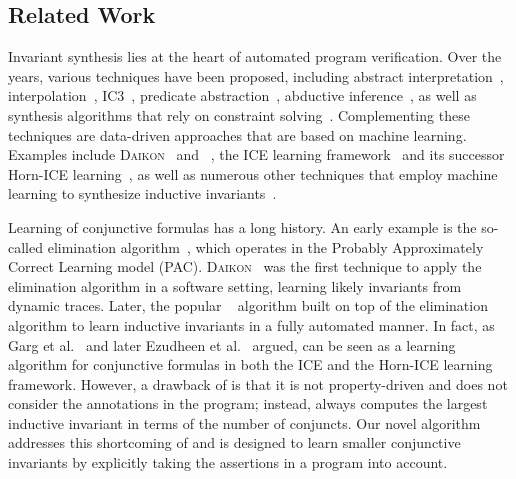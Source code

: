 
\subsection*{Related Work}
Invariant synthesis lies at the heart of automated program verification.
Over the years, various techniques have been proposed, including abstract interpretation~\cite{DBLP:conf/popl/CousotC77}, interpolation~\cite{DBLP:conf/cav/McMillan03}, IC3~\cite{DBLP:conf/vmcai/Bradley11}, predicate abstraction~\cite{DBLP:conf/pldi/BallMMR01}, abductive inference~\cite{DBLP:conf/oopsla/DilligDLM13}, as well as synthesis algorithms that rely on constraint solving~\cite{DBLP:conf/cav/ColonSS03,DBLP:conf/fmcad/FedyukovichKB17,DBLP:conf/pldi/GulwaniSV08,DBLP:conf/cav/GuptaR09}.
Complementing these techniques are data-driven approaches that are based on machine learning.
Examples include \textsc{Daikon}~\cite{DBLP:conf/icse/ErnstCGN00} and \houdini~\cite{DBLP:conf/fm/FlanaganL01}, the ICE learning framework~\cite{DBLP:conf/cav/0001LMN14} and its successor Horn-ICE learning~\cite{DBLP:conf/tacas/ChampionC0S18,DBLP:journals/pacmpl/EzudheenND0M18}, as well as numerous other techniques that employ machine learning to synthesize inductive invariants~\cite{DBLP:conf/cav/0001LMN13,DBLP:journals/corr/KrishnaPW15,DBLP:conf/cav/0001A14,DBLP:conf/esop/0001GHALN13,DBLP:conf/sas/0001GHAN13,DBLP:conf/cav/SharmaNA12,DBLP:conf/pldi/ZhuMJ18}.


Learning of conjunctive formulas has a long history.
An early example is the so-called elimination algorithm~\cite{Kearns:1994:ICL:200548}, which operates in the Probably Approximately Correct Learning model (PAC).
\textsc{Daikon}~\cite{DBLP:conf/icse/ErnstCGN00} was the first technique to apply the elimination algorithm in a software setting, learning likely invariants from dynamic traces.
Later, the popular \houdini~\cite{DBLP:conf/fm/FlanaganL01} algorithm built on top of the elimination algorithm to learn inductive invariants in a fully automated manner.
In fact, as Garg et al.~\cite{Garg:2016} and later Ezudheen et al.~\cite{DBLP:journals/pacmpl/EzudheenND0M18} argued, \houdini can be seen as a learning algorithm for conjunctive formulas in both the ICE and the Horn-ICE learning framework.
However, a drawback of \houdini is that it is not property-driven and does not consider the annotations in the program; instead, \houdini always computes the largest inductive invariant in terms of the number of conjuncts. 
Our novel \sorcar algorithm addresses this shortcoming of \houdini and is designed to learn smaller conjunctive invariants by explicitly taking the assertions in a program into account.